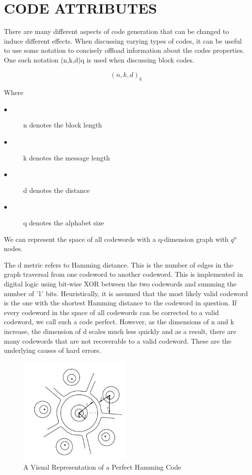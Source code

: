 \documentclass[letterpaper, 10 pt, conference]{ieeeconf}
\begin{document}
\section{CODE ATTRIBUTES}

There are many different aspects of code generation that can be changed to induce different effects.  When discussing varying types of codes, it can be useful to use some notation to concisely offload information about the codes properties.  One such notation (n,k,d)q is used when discussing block codes.

\begin{equation}
(n,k,d)_q
\end{equation}

Where 
\begin{description}
  \item[$\bullet$ ] n denotes the block length
  \item[$\bullet$ ] k denotes the message length
  \item[$\bullet$ ] d denotes the distance
  \item[$\bullet$ ] q denotes the alphabet size
\end{description}

We can represent the space of all codewords with a q-dimension graph with $q^n$ nodes.

The d metric refers to Hamming distance.  This is the number of edges in the graph traversal from one codeword to another codeword.  This is implemented in digital logic using bit-wise XOR between the two codewords and summing the number of '1' bits.  Heuristically, it is assumed that the most likely valid codeword is the one with the shortest Hamming distance to the codeword in question.  If every codeword in the space of all codewords can be corrected to a valid codeword, we call such a code perfect.  However, as the dimensions of n and k increase, the dimension of d scales much less quickly and as a result, there are many codewords that are not recoverable to a valid codeword.  These are the underlying causes of hard errors.

\begin{figure}[!ht]
	\centering
	\includegraphics [width=0.5\textwidth] {Hamming Sphere.JPG} 
    \caption{A Visual Representation of a Perfect Hamming Code\cite{McKay}}

\end{figure}
\end{document}
